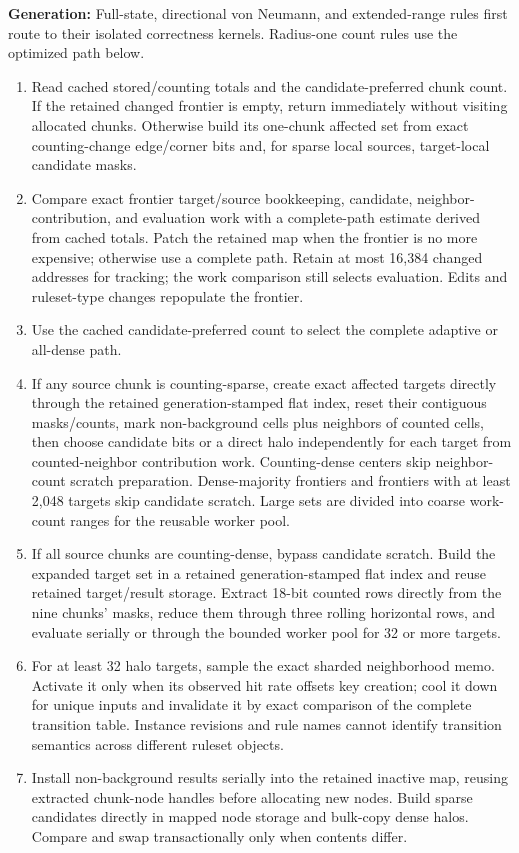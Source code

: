 \textbf{Generation:} Full-state, directional von Neumann, and extended-range
rules first route to their isolated correctness kernels. Radius-one count rules
use the optimized path below.
\begin{enumerate}
  \item Read cached stored/counting totals and the candidate-preferred chunk
        count. If the retained changed frontier is empty, return immediately
        without visiting allocated chunks. Otherwise build its one-chunk
        affected set from exact counting-change edge/corner bits and, for sparse
        local sources, target-local candidate masks.
  \item Compare exact frontier target/source bookkeeping, candidate,
        neighbor-contribution, and evaluation work with a complete-path
        estimate derived from cached totals. Patch the retained map when the
        frontier is no more expensive; otherwise use a complete path. Retain
        at most 16,384 changed addresses for tracking; the work comparison still
        selects evaluation. Edits and ruleset-type changes
        repopulate the frontier.
  \item Use the cached candidate-preferred count to select the complete
        adaptive or all-dense path.
  \item If any source chunk is counting-sparse, create exact affected targets
        directly through the
        retained generation-stamped flat index, reset their contiguous
        masks/counts, mark non-background cells plus neighbors of counted cells,
        then choose candidate bits or a direct halo independently for each
        target from counted-neighbor contribution work. Counting-dense centers
        skip neighbor-count scratch preparation. Dense-majority frontiers and
        frontiers with at least 2,048 targets skip candidate scratch. Large
        sets are divided
        into coarse work-count ranges for the reusable worker pool.
  \item If all source chunks are counting-dense, bypass candidate scratch.
        Build the expanded target set in a retained generation-stamped flat
        index and reuse retained target/result storage. Extract 18-bit counted
        rows directly from the nine chunks' masks, reduce them through three
        rolling horizontal rows, and evaluate serially or through the bounded
        worker pool for 32 or more targets.
  \item For at least 32 halo targets, sample the exact sharded neighborhood
        memo. Activate it only when its observed hit rate offsets key creation;
        cool it down for unique inputs and invalidate it by exact comparison
        of the complete transition table. Instance revisions and rule names
        cannot identify transition semantics across different ruleset objects.
  \item Install non-background results serially into the retained inactive map,
        reusing extracted chunk-node handles before allocating new nodes. Build
        sparse candidates directly in mapped node storage and bulk-copy dense
        halos. Compare
        and swap transactionally only when contents differ.
\end{enumerate}

